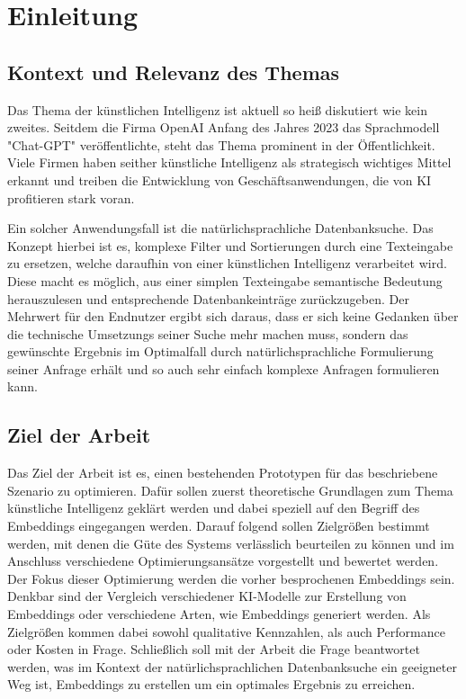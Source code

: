 \section{Einleitung}

\subsection{Kontext und Relevanz des Themas}
Das Thema der künstlichen Intelligenz ist aktuell so heiß diskutiert wie kein zweites. 
Seitdem die Firma OpenAI Anfang des Jahres 2023 das Sprachmodell "Chat-GPT" veröffentlichte, steht das Thema prominent in der Öffentlichkeit. 
Viele Firmen haben seither künstliche Intelligenz als strategisch wichtiges Mittel erkannt und treiben die Entwicklung von Geschäftsanwendungen,
die von KI profitieren stark voran. 

Ein solcher Anwendungsfall ist die natürlichsprachliche Datenbanksuche. Das Konzept hierbei ist es, komplexe
Filter und Sortierungen durch eine Texteingabe zu ersetzen, welche daraufhin von einer künstlichen Intelligenz verarbeitet wird. Diese macht es
möglich, aus einer simplen Texteingabe semantische Bedeutung herauszulesen und entsprechende Datenbankeinträge zurückzugeben. Der Mehrwert für den
Endnutzer ergibt sich daraus, dass er sich keine Gedanken über die technische Umsetzungs seiner Suche mehr machen muss, sondern das gewünschte
Ergebnis im Optimalfall durch natürlichsprachliche Formulierung seiner Anfrage erhält und so auch sehr einfach komplexe Anfragen formulieren kann.

\subsection{Ziel der Arbeit}
Das Ziel der Arbeit ist es, einen bestehenden Prototypen für das beschriebene Szenario zu optimieren. Dafür sollen zuerst theoretische Grundlagen zum
Thema künstliche Intelligenz geklärt werden und dabei speziell auf den Begriff des Embeddings eingegangen werden. Darauf folgend sollen Zielgrößen
bestimmt werden, mit denen die Güte des Systems verlässlich beurteilen zu können und im Anschluss verschiedene Optimierungsansätze vorgestellt und
bewertet werden. Der Fokus dieser Optimierung werden die vorher besprochenen Embeddings sein. Denkbar sind der Vergleich verschiedener KI-Modelle
zur Erstellung von Embeddings oder verschiedene Arten, wie Embeddings generiert werden. Als Zielgrößen kommen dabei sowohl qualitative Kennzahlen, 
als auch Performance oder Kosten in Frage.
Schließlich soll mit der Arbeit die Frage beantwortet werden, was im Kontext der natürlichsprachlichen Datenbanksuche ein geeigneter Weg ist, 
Embeddings zu erstellen um ein optimales Ergebnis zu erreichen.
